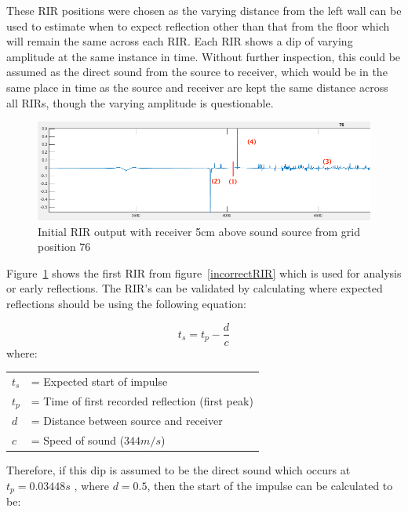 \documentclass[../../main.tex]{subfiles}
\begin{document}
			These \ac{RIR} positions were chosen as the varying distance from the left wall can be used to estimate when to expect reflection other than that from the floor which will remain the same across each \ac{RIR}. Each \ac{RIR} shows a dip of varying amplitude at the same instance in time. Without further inspection, this could be assumed as the direct sound from the source to receiver, which would be in the same place in time as the source and receiver are kept the same distance across all RIRs, though the varying amplitude is questionable.

			\begin{figure}[H]
				\centerline{\includegraphics[scale = 0.5]{Sections/Implementation/Odeon/images/incorrectRIR/RIR_76_incorrect_edit_crop.png}}
				\caption{Initial \ac{RIR} output with receiver 5cm above sound source from grid position 76}
				\label{incorrectRIR_76}
			\end{figure}

			Figure~\ref{incorrectRIR_76} shows the first \ac{RIR} from figure~\ref{incorrectRIR} which is used for analysis or early reflections. The \ac{RIR}'s can be validated by calculating where expected reflections should be using the following equation:
			
			\begin{equation}\label{distance}
				t_s = t_p - \frac{d}{c}
			\end{equation}
			where:

			\begin{tabular}{l l}
			$t_s$ & = Expected start of impulse \\
			$t_p$ & = Time of first recorded reflection (first peak) \\
			$d$ & = Distance between source and receiver\\
			$c$ & = Speed of sound ($344m/s$) \\
			\end{tabular}


			Therefore, if this dip is assumed to be the direct sound which occurs at $t_p = 0.03448s$ , where $d = 0.5$, then the start of the impulse can be calculated to be:
\end{document}
